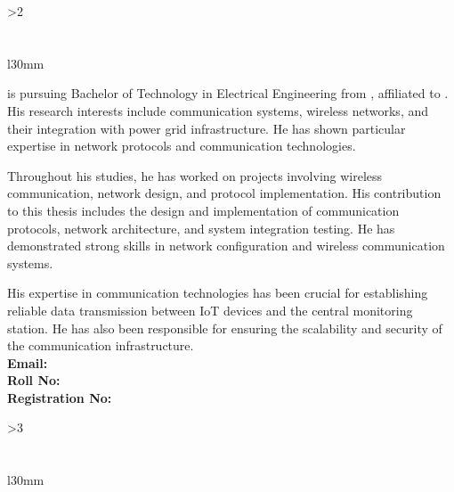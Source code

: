 \ifnum\GetNumberOfStudents>2\relax
\section*{\GetStudentThree}
\begin{wrapfigure}{l}{30mm}
	\vspace{-0.48cm}
\end{wrapfigure}
\justifying

\textbf{\GetStudentThree} is pursuing Bachelor of Technology in Electrical Engineering from \GetCollege, affiliated to \GetUniversity. His research interests include communication systems, wireless networks, and their integration with power grid infrastructure. He has shown particular expertise in network protocols and communication technologies.

Throughout his studies, he has worked on projects involving wireless communication, network design, and protocol implementation. His contribution to this thesis includes the design and implementation of communication protocols, network architecture, and system integration testing. He has demonstrated strong skills in network configuration and wireless communication systems.

His expertise in communication technologies has been crucial for establishing reliable data transmission between IoT devices and the central monitoring station. He has also been responsible for ensuring the scalability and security of the communication infrastructure.
\\
\noindent
\textbf{Email:} \GetEmailThree \quad \\ \textbf{Roll No:} \GetRollThree \quad \\ \textbf{Registration No:} \GetRegThree

\vspace{1cm}
\fi

\ifnum\GetNumberOfStudents>3\relax
\section*{\GetStudentFour}
\begin{wrapfigure}{l}{30mm}
	\vspace{-0.48cm}
\end{wrapfigure}
\justifying

